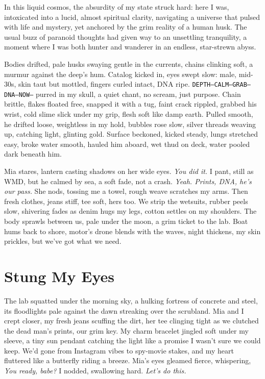 \documentclass[12pt,oneside]{book}
\newcommand{\note}[1]{\texttt{#1}}
\begin{document}
In this liquid cosmos, the absurdity of my state struck hard: here I was, intoxicated into a lucid, almost spiritual clarity, navigating a universe that pulsed with life and mystery, yet anchored by the grim reality of a human husk. The usual buzz of paranoid thoughts had given way to an unsettling tranquility, a moment where I was both hunter and wanderer in an endless, star-strewn abyss.

Bodies drifted, pale husks swaying gentle in the currents, chains clinking soft, a murmur against the deep’s hum. Catalog kicked in, eyes swept slow: male, mid-30s, skin taut but mottled, fingers curled intact, DNA ripe. \note{DEPTH—CALM—GRAB—DNA—NOW—} purred in my skull, a quiet chant, no scream, just purpose. Chain brittle, flakes floated free, snapped it with a tug, faint crack rippled, grabbed his wrist, cold slime slick under my grip, flesh soft like damp earth. Pulled smooth, he drifted loose, weightless in my hold, bubbles rose slow, silver threads weaving up, catching light, glinting gold. Surface beckoned, kicked steady, lungs stretched easy, broke water smooth, hauled him aboard, wet thud on deck, water pooled dark beneath him.

Mia stares, lantern casting shadows on her wide eyes. \textit{You did it.} I pant, still as WMD, but he calmed by sea, a soft fade, not a crash. \textit{Yeah. Prints, DNA, he’s our pass.} She nods, tossing me a towel, rough weave scratches my arms. Then fresh clothes, jeans stiff, tee soft, hers too. We strip the wetsuits, rubber peels slow, shivering fades as denim hugs my legs, cotton settles on my shoulders. The body sprawls between us, pale under the moon, a grim ticket to the lab. Boat hums back to shore, motor’s drone blends with the waves, night thickens, my skin prickles, but we’ve got what we need.

\chapter{Stung My Eyes}

The lab squatted under the morning sky, a hulking fortress of concrete and steel, its floodlights pale against the dawn streaking over the scrubland. Mia and I crept closer, my fresh jeans scuffing the dirt, her tee clinging tight as we clutched the dead man’s prints, our grim key. My charm bracelet jingled soft under my sleeve, a tiny sun pendant catching the light like a promise I wasn’t sure we could keep. We’d gone from Instagram vibes to spy-movie stakes, and my heart fluttered like a butterfly riding a breeze. Mia’s eyes gleamed fierce, whispering, \textit{You ready, babe?} I nodded, swallowing hard. \textit{Let’s do this.}
\end{document}
